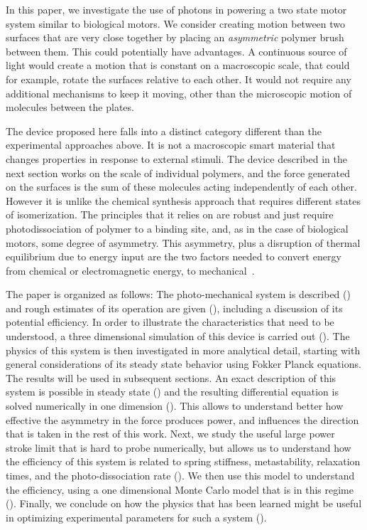 \documentclass[11pt]{ucthesis}
\begin{document}
In this paper, we investigate the use of photons in powering a two state motor
system similar to biological motors. We consider
creating motion between two surfaces that are very close together by placing
an {\em asymmetric} polymer brush between them.
This could potentially have advantages. A continuous source of light would create
a motion that is constant on a macroscopic scale, that could for example, rotate
the surfaces relative to each other. It would not require any additional
mechanisms to keep it moving, other than the microscopic motion of molecules
between the plates. 

The device proposed here falls into a distinct category different than the
experimental approaches above. It is not a macroscopic smart
material that changes properties in response to external stimuli. The device
described in the next section works on the scale of individual polymers, 
and the force generated on the surfaces is the sum of these molecules
acting independently of each other. However it is unlike the chemical synthesis
approach that requires different states of isomerization. The principles
that it relies on are robust and just require
photodissociation of polymer to a binding site, and, as in the case of biological
motors, some degree of asymmetry.
This asymmetry, plus a disruption of thermal equilibrium due to energy input
are the two factors needed to convert energy from chemical or electromagnetic energy, to
mechanical~\cite{ProstPRL}.

The paper is organized as follows: The photo-mechanical system is described () and rough estimates of its
operation are given (), including a discussion
of its potential efficiency. In order to illustrate the characteristics
that need to be understood, a three dimensional simulation of this device
is carried out (). The physics of this system is then
investigated in more analytical detail, starting with general considerations of its steady state behavior using Fokker Planck equations. The results will be used in subsequent sections. An exact description of this
system is possible in steady state () and the resulting differential equation
is solved numerically in one dimension (). This allows
to understand better how effective the asymmetry in the force produces power,
and influences the direction that is taken in the rest of this work. Next, we study the useful large power stroke limit that is hard to probe
numerically, but allows us to understand how the efficiency of this system is
related to spring stiffness, metastability, relaxation times, and the
photo-dissociation rate (). We then use this model to understand the efficiency,
using a one dimensional Monte Carlo model that is in this regime (). Finally, we conclude on how the physics that has been learned 
might be useful in optimizing experimental parameters for such a system ().
\end{document}
